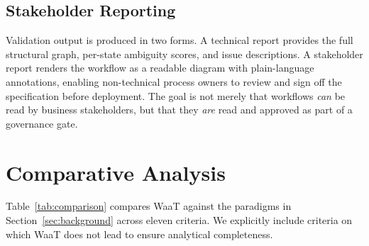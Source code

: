 \documentclass[10pt,conference]{IEEEtran}
\begin{document}
\subsection{Stakeholder Reporting}

Validation output is produced in two forms.  A technical report
provides the full structural graph, per-state ambiguity scores,
and issue descriptions.  A stakeholder report renders the workflow
as a readable diagram with plain-language annotations, enabling
non-technical process owners to review and sign off the
specification before deployment.  The goal is not merely that
workflows \emph{can} be read by business stakeholders, but that
they \emph{are} read and approved as part of a governance gate.


\section{Comparative Analysis}
\label{sec:comparison}

Table~\ref{tab:comparison} compares WaaT against the paradigms in
Section~\ref{sec:background} across eleven criteria.  We
explicitly include criteria on which WaaT does not lead to ensure
analytical completeness.
\end{document}
